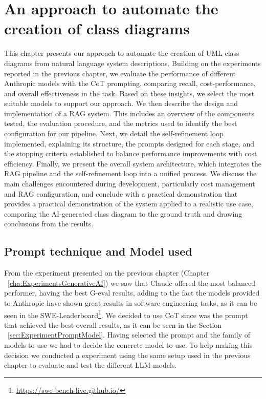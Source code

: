 
%

\chapter{An approach to automate the creation of class diagrams}
\label{cha:approachAutomateModeling}
This chapter presents our approach to automate the creation of UML class diagrams from natural language system descriptions.
Building on the experiments reported in the previous chapter, we evaluate the performance of different Anthropic models with the CoT prompting, comparing recall, cost-performance, and overall effectiveness in the task. Based on these insights, we select the most suitable models to support our approach.
We then describe the design and implementation of a RAG system. This includes an overview of the components tested, the evaluation procedure, and the metrics used to identify the best configuration for our pipeline.
Next, we detail the self-refinement loop implemented, explaining its structure, the prompts designed for each stage, and the stopping criteria established to balance performance improvements with cost efficiency.
Finally, we present the overall system architecture, which integrates the RAG pipeline and the self-refinement loop into a unified process. 
We discuss the main challenges encountered during development, particularly cost management and RAG configuration, and conclude with a practical demonstration that provides a practical demonstration of the system applied to a realistic use case, comparing
 the AI-generated class diagram to the ground truth and drawing conclusions from the
 results.
\section{Prompt technique and Model used}
\label{sec:promptTechniqueAndModelUsed}
From the experiment presented on the previous chapter (Chapter ~\ref{cha:ExperimentsGenerativeAI}) we saw that Claude offered the most balanced performer, having the best G-eval results, adding to the fact the models provided to Anthropic have shown great results in software engineering tasks, as it can be seen in the SWE-Leaderboard\footnote{\url{https://swe-bench-live.github.io/}}. We decided to use CoT since was the prompt that achieved the best overall results, as it can be seen in the Section ~\ref{sec:ExperimentPromptModel}.
Having selected the prompt and the family of models to use we had to decide the concrete model to use. To help making this decision we conducted a experiment using the same setup used in the previous chapter to evaluate and test the different LLM models.

